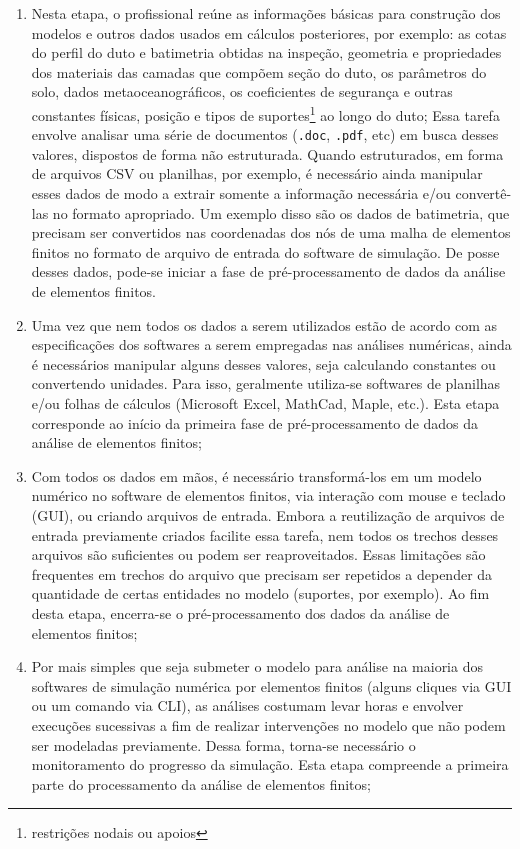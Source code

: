 \begin{enumerate}[label= (\arabic*)]
    \item Nesta etapa, o profissional reúne as informações básicas para construção dos modelos e outros dados usados em cálculos posteriores, por exemplo: as cotas do perfil do duto e batimetria obtidas na inspeção, geometria e propriedades dos materiais das camadas que compõem seção do duto, os parâmetros do solo, dados metaoceanográficos, os coeficientes de segurança e outras constantes físicas, posição e tipos de suportes\footnote{restrições nodais ou apoios} ao longo do duto;
    Essa tarefa envolve analisar uma série de documentos (\texttt{.doc}, \texttt{.pdf}, etc) em busca desses valores, dispostos de forma não estruturada. Quando estruturados, em forma de arquivos CSV ou planilhas, por exemplo, é necessário ainda manipular esses dados de modo a extrair somente a informação necessária e/ou convertê-las no formato apropriado. Um exemplo disso são os dados de batimetria, que precisam ser convertidos nas coordenadas dos nós de uma malha de elementos finitos no formato de arquivo de entrada do software de simulação. De posse desses dados, pode-se iniciar a fase de pré-processamento de dados da análise de elementos finitos.
    \item Uma vez que nem todos os dados a serem utilizados estão de acordo com as especificações dos softwares a serem empregadas nas análises numéricas, ainda é necessários manipular alguns desses valores, seja calculando constantes ou convertendo unidades. Para isso, geralmente utiliza-se softwares de planilhas e/ou folhas de cálculos (Microsoft Excel, MathCad, Maple, etc.). Esta etapa corresponde ao início da primeira fase de pré-processamento de dados da análise de elementos finitos;
    \item Com todos os dados em mãos, é necessário transformá-los em um modelo numérico no software de elementos finitos, via interação com mouse e teclado (GUI), ou criando arquivos de entrada. Embora a reutilização de arquivos de entrada previamente criados facilite essa tarefa, nem todos os trechos desses arquivos são suficientes ou podem ser reaproveitados. Essas limitações são frequentes em trechos do arquivo que precisam ser repetidos a depender da quantidade de certas entidades no modelo (suportes, por exemplo). Ao fim desta etapa, encerra-se o pré-processamento dos dados da análise de elementos finitos;
    \item Por mais simples que seja submeter o modelo para análise na maioria dos softwares de simulação numérica por elementos finitos (alguns cliques via GUI ou um comando via CLI), as análises costumam levar horas e envolver execuções sucessivas a fim de realizar intervenções no modelo que não podem ser modeladas previamente. Dessa forma, torna-se necessário o monitoramento do progresso da simulação. Esta etapa compreende a primeira parte do processamento da análise de elementos finitos;

\end{enumerate}
